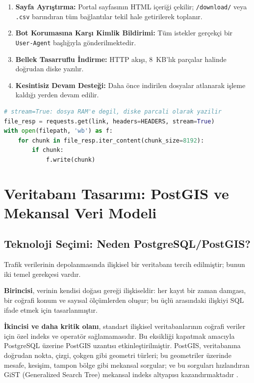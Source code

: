 \documentclass[12pt,a4paper]{article}
\begin{document}
\begin{enumerate}
    \item \textbf{Sayfa Ayrıştırma:} Portal sayfasının HTML içeriği çekilir; \texttt{/download/} veya \texttt{.csv} barındıran tüm bağlantılar tekil hale getirilerek toplanır.
    \item \textbf{Bot Korumasına Karşı Kimlik Bildirimi:} Tüm istekler gerçekçi bir \texttt{User-Agent} başlığıyla gönderilmektedir.
    \item \textbf{Bellek Tasarruflu İndirme:} HTTP akışı, 8~KB'lık parçalar halinde doğrudan diske yazılır.
    \item \textbf{Kesintisiz Devam Desteği:} Daha önce indirilen dosyalar atlanarak işleme kaldığı yerden devam edilir.
\end{enumerate}

\begin{lstlisting}[language=Python, caption={Bellek tasarruflu chunk-download mantığı}]
# stream=True: dosya RAM'e degil, diske parcali olarak yazilir
file_resp = requests.get(link, headers=HEADERS, stream=True)
with open(filepath, 'wb') as f:
    for chunk in file_resp.iter_content(chunk_size=8192):
        if chunk:
            f.write(chunk)
\end{lstlisting}

\section{Veritabanı Tasarımı: PostGIS ve Mekansal Veri Modeli}

\subsection{Teknoloji Seçimi: Neden PostgreSQL/PostGIS?}

Trafik verilerinin depolanmasında ilişkisel bir veritabanı tercih edilmiştir; bunun iki temel gerekçesi vardır.

\textbf{Birincisi}, verinin kendisi doğası gereği ilişkiseldir: her kayıt bir zaman damgası, bir coğrafi konum ve sayısal ölçümlerden oluşur; bu üçlü arasındaki ilişkiyi SQL ifade etmek için tasarlanmıştır.

\textbf{İkincisi ve daha kritik olanı}, standart ilişkisel veritabanlarının coğrafi veriler için özel indeks ve operatör sağlamamasıdır. Bu eksikliği kapatmak amacıyla PostgreSQL üzerine PostGIS uzantısı etkinleştirilmiştir. PostGIS, veritabanına doğrudan nokta, çizgi, çokgen gibi geometri türleri; bu geometriler üzerinde mesafe, kesişim, tampon bölge gibi mekansal sorgular; ve bu sorguları hızlandıran GiST (Generalized Search Tree) mekansal indeks altyapısı kazandırmaktadır \cite{postgis-training}.
\end{document}
